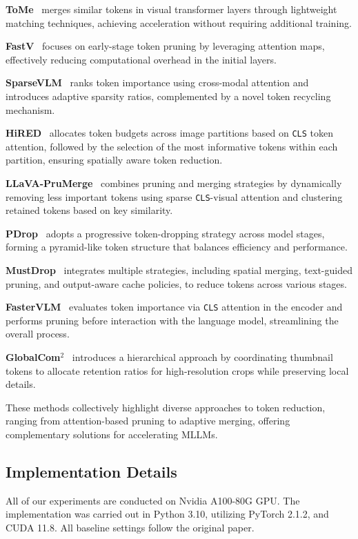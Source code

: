 \textbf{ToMe}~\citep{bolya2022tome} merges similar tokens in visual transformer layers through lightweight matching techniques, achieving acceleration without requiring additional training.

\textbf{FastV}~\citep{chen2024image} focuses on early-stage token pruning by leveraging attention maps, effectively reducing computational overhead in the initial layers.

\textbf{SparseVLM}~\citep{zhang2024sparsevlm} ranks token importance using cross-modal attention and introduces adaptive sparsity ratios, complemented by a novel token recycling mechanism.

\textbf{HiRED}~\citep{arif2024hired} allocates token budgets across image partitions based on \texttt{CLS} token attention, followed by the selection of the most informative tokens within each partition, ensuring spatially aware token reduction.

\textbf{LLaVA-PruMerge}~\citep{shang2024llava} combines pruning and merging strategies by dynamically removing less important tokens using sparse \texttt{CLS}-visual attention and clustering retained tokens based on key similarity.

\textbf{PDrop}~\citep{xing2024PyramidDrop} adopts a progressive token-dropping strategy across model stages, forming a pyramid-like token structure that balances efficiency and performance.

\textbf{MustDrop}~\citep{liu2024multi} integrates multiple strategies, including spatial merging, text-guided pruning, and output-aware cache policies, to reduce tokens across various stages.

\textbf{FasterVLM}~\citep{zhang2024cls} evaluates token importance via \texttt{CLS} attention in the encoder and performs pruning before interaction with the language model, streamlining the overall process.

\textbf{GlobalCom$^2$}~\citep{liu2025compression} introduces a hierarchical approach by coordinating thumbnail tokens to allocate retention ratios for high-resolution crops while preserving local details.

These methods collectively highlight diverse approaches to token reduction, ranging from attention-based pruning to adaptive merging, offering complementary solutions for accelerating MLLMs.



\subsection{Implementation Details}\label{app:Implementation_details}
All of our experiments are conducted on Nvidia A100-80G GPU. The implementation was carried out in Python 3.10, utilizing PyTorch 2.1.2, and CUDA 11.8. All baseline settings follow the original paper. \\


